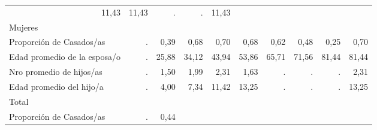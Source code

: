 \begin{tabular}{llllllllll}
  \multicolumn{1}{r}{11,43} &
  \multicolumn{1}{r}{11,43} &
  \multicolumn{1}{r}{.} &
  \multicolumn{1}{r}{.} &
  \multicolumn{1}{r}{11,43} \\
\multicolumn{1}{l}{\hspace{1em}Mujeres} &
  \multicolumn{1}{|r}{} &
  \multicolumn{1}{r}{} &
  \multicolumn{1}{r}{} &
  \multicolumn{1}{r}{} &
  \multicolumn{1}{r}{} &
  \multicolumn{1}{r}{} &
  \multicolumn{1}{r}{} &
  \multicolumn{1}{r}{} &
  \multicolumn{1}{r}{} \\
\multicolumn{1}{l}{\hspace{2em}Proporción de Casados/as} &
  \multicolumn{1}{|r}{.} &
  \multicolumn{1}{r}{0,39} &
  \multicolumn{1}{r}{0,68} &
  \multicolumn{1}{r}{0,70} &
  \multicolumn{1}{r}{0,68} &
  \multicolumn{1}{r}{0,62} &
  \multicolumn{1}{r}{0,48} &
  \multicolumn{1}{r}{0,25} &
  \multicolumn{1}{r}{0,70} \\
\multicolumn{1}{l}{\hspace{2em}Edad promedio de la esposa/o} &
  \multicolumn{1}{|r}{.} &
  \multicolumn{1}{r}{25,88} &
  \multicolumn{1}{r}{34,12} &
  \multicolumn{1}{r}{43,94} &
  \multicolumn{1}{r}{53,86} &
  \multicolumn{1}{r}{65,71} &
  \multicolumn{1}{r}{71,56} &
  \multicolumn{1}{r}{81,44} &
  \multicolumn{1}{r}{81,44} \\
\multicolumn{1}{l}{\hspace{2em}Nro promedio de hijos/as} &
  \multicolumn{1}{|r}{.} &
  \multicolumn{1}{r}{1,50} &
  \multicolumn{1}{r}{1,99} &
  \multicolumn{1}{r}{2,31} &
  \multicolumn{1}{r}{1,63} &
  \multicolumn{1}{r}{.} &
  \multicolumn{1}{r}{.} &
  \multicolumn{1}{r}{.} &
  \multicolumn{1}{r}{2,31} \\
\multicolumn{1}{l}{\hspace{2em}Edad promedio del hijo/a} &
  \multicolumn{1}{|r}{.} &
  \multicolumn{1}{r}{4,00} &
  \multicolumn{1}{r}{7,34} &
  \multicolumn{1}{r}{11,42} &
  \multicolumn{1}{r}{13,25} &
  \multicolumn{1}{r}{.} &
  \multicolumn{1}{r}{.} &
  \multicolumn{1}{r}{.} &
  \multicolumn{1}{r}{13,25} \\
\multicolumn{1}{l}{\hspace{1em}Total} &
  \multicolumn{1}{|r}{} &
  \multicolumn{1}{r}{} &
  \multicolumn{1}{r}{} &
  \multicolumn{1}{r}{} &
  \multicolumn{1}{r}{} &
  \multicolumn{1}{r}{} &
  \multicolumn{1}{r}{} &
  \multicolumn{1}{r}{} &
  \multicolumn{1}{r}{} \\
\multicolumn{1}{l}{\hspace{2em}Proporción de Casados/as} &
  \multicolumn{1}{|r}{.} &
  \multicolumn{1}{r}{0,44} &

\end{tabular}
